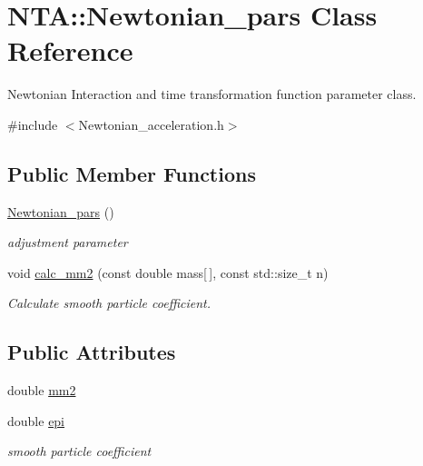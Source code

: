 \hypertarget{classNTA_1_1Newtonian__pars}{}\section{N\+TA\+:\+:Newtonian\+\_\+pars Class Reference}
\label{classNTA_1_1Newtonian__pars}


Newtonian Interaction and time transformation function parameter class.  




{\ttfamily \#include $<$Newtonian\+\_\+acceleration.\+h$>$}

\subsection*{Public Member Functions}
\begin{DoxyCompactItemize}
\item 
\hyperlink{classNTA_1_1Newtonian__pars_a350f6c6c5eaec1520604955ee32cd94b}{Newtonian\+\_\+pars} ()
\begin{DoxyCompactList}\small\item\em adjustment parameter \end{DoxyCompactList}\item 
void \hyperlink{classNTA_1_1Newtonian__pars_ae447dcfbd1da0436db3684be1e19734d}{calc\+\_\+mm2} (const double mass\mbox{[}$\,$\mbox{]}, const std\+::size\+\_\+t n)
\begin{DoxyCompactList}\small\item\em Calculate smooth particle coefficient. \end{DoxyCompactList}\end{DoxyCompactItemize}
\subsection*{Public Attributes}
\begin{DoxyCompactItemize}
\item 
double \hyperlink{classNTA_1_1Newtonian__pars_a2dbcde3115bdf43e8fcec4626e7ee5bb}{mm2}
\item 
double \hyperlink{classNTA_1_1Newtonian__pars_a4c4f79cd0d1600f8f038cdec15981268}{epi}
\begin{DoxyCompactList}\small\item\em smooth particle coefficient \end{DoxyCompactList}\end{DoxyCompactItemize}


